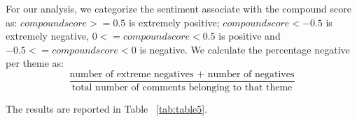 For our analysis, we categorize the sentiment associate with the compound score as: $compound score >= 0.5$ is extremely positive; $compound score <-0.5$ is extremely negative, $ 0<=compound score<0.5$ is positive and $-0.5<=compound score<0$ is negative. We calculate the percentage negative per theme as: $$\frac{\text{number of extreme negatives + number of negatives}}{\text{total number of comments belonging to that theme}}$$

The results are reported in Table ~\ref{tab:table5}.





